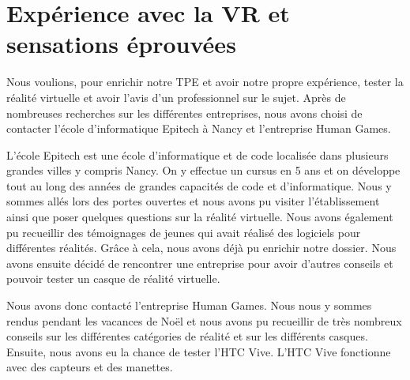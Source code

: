 \documentclass[12pt, a4paper]{report}
\begin{document}
\newpage

\section[\'{E}xpérience et sensations]{Expérience avec la VR et sensations éprouvées}

Nous voulions, pour enrichir notre TPE et avoir notre propre expérience, tester la réalité virtuelle et avoir l'avis d'un professionnel sur le sujet. Après de nombreuses recherches sur les différentes entreprises, nous avons choisi de contacter l'école d'informatique  Epitech à Nancy et l'entreprise Human Games.

L'école Epitech est une école d'informatique et de code localisée dans plusieurs grandes villes y compris Nancy. On y effectue un cursus en 5 ans et on développe tout au long des années de grandes capacités de code et d'informatique. Nous y sommes allés lors des portes ouvertes et nous avons pu visiter l'établissement ainsi que poser quelques questions sur la réalité virtuelle. Nous avons également pu recueillir des témoignages de jeunes qui avait réalisé des logiciels pour différentes réalités. Grâce à cela, nous avons déjà pu enrichir notre dossier. Nous avons ensuite décidé de rencontrer une entreprise pour avoir d'autres conseils et pouvoir tester un casque de réalité virtuelle.


Nous avons donc contacté l'entreprise Human Games. Nous nous y sommes rendus pendant les vacances de Noël et nous avons pu recueillir de très nombreux conseils sur les différentes catégories de réalité et sur les différents casques. Ensuite, nous avons eu la chance de tester l'HTC Vive. L'HTC Vive fonctionne avec des capteurs et des manettes.
\end{document}
